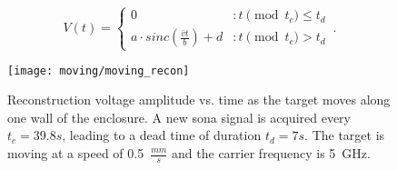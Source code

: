 \begin{equation}\label{eq:vt}
  V(t) = \left\{
        \begin{array}{lr}
                0 & : t\pmod{t_c} \le t_d \\
                a\cdot sinc(\frac{\bar{v}t}{b})+d & : t\pmod{t_c} > t_d
        \end{array}\,.
  \right.
\end{equation}

\begin{figure}[t]
\centering
\texttt{[image: moving/moving\_recon]}
    \caption[Voltage measured during moving reconstructions]{Reconstruction voltage amplitude vs. time as the target moves along one wall of the enclosure. A new sona signal is acquired every $t_c = 39.8s$, leading to a dead time of duration $t_d = 7s$. The target is moving at a speed of 0.5~$\frac{mm}{s}$ and the carrier frequency is 5~GHz.}
    \label{fig:moving-recon}
\end{figure}
